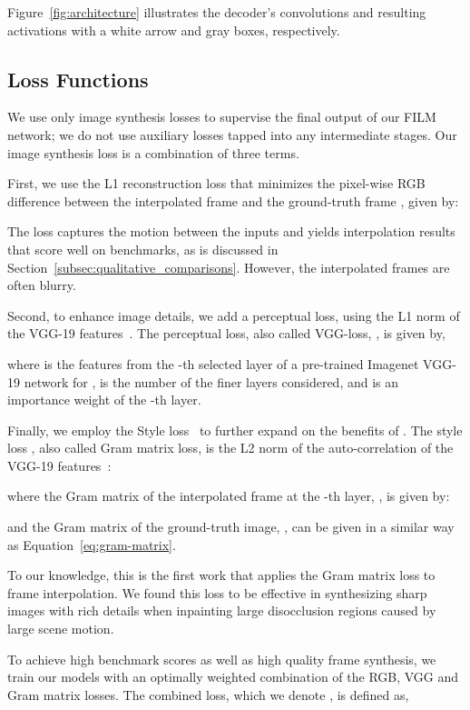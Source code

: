 \documentclass[runningheads]{llncs}
\begin{document}
Figure~\ref{fig:architecture} illustrates the decoder's convolutions and resulting activations with a white arrow and gray boxes, respectively.

\subsection{Loss Functions}
We use only image synthesis losses to supervise the final output of our FILM network; we do not use auxiliary losses tapped into any intermediate stages. Our image synthesis loss is a combination of three terms.

First, we use the L1 reconstruction loss that minimizes the pixel-wise RGB difference between the interpolated frame  and the ground-truth frame , given by:

The  loss captures the motion between the inputs  and yields interpolation results that score well on benchmarks, as is discussed in Section~\ref{subsec:qualitative_comparisons}. However, the interpolated frames are often blurry. 

Second, to enhance image details, we add a perceptual loss, using the L1 norm of the VGG-19 features~\cite{vgg-16}. The perceptual loss, also called VGG-loss, , is given by, 

where  is the features from the -th selected layer of a pre-trained Imagenet VGG-19 network for ,  is the number of the finer layers considered, and  is an importance weight of the -th layer. 

Finally, we employ the Style loss~\cite{style-transfer,reda-sdc,liu-inpainting} to further expand on the benefits of . The style loss , also called Gram matrix loss, is the L2 norm of the auto-correlation of the VGG-19 features~\cite{vgg-16}: 


where the Gram matrix of the interpolated frame at the  -th layer, , is given by:

and the Gram matrix of the ground-truth image, , can be given in a similar way as Equation~\ref{eq:gram-matrix}. 

To our knowledge, this is the first work that applies the Gram matrix loss to frame interpolation. We found this loss to be effective in synthesizing sharp images with rich details when inpainting large disocclusion regions caused by large scene motion. 

To achieve high benchmark scores as well as high quality frame synthesis, we train our models with an optimally weighted combination of the RGB, VGG and Gram matrix losses. The combined loss, which we denote , is defined as, 
\end{document}
